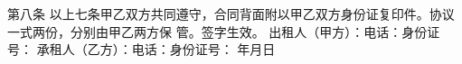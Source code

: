 \documentclass[12pt,a4paper]{article}
\begin{document}
\newline{}
\newline{}
第八条
\newline{}
以上七条甲乙双方共同遵守，合同背面附以甲乙双方身份证复印件。协议一式两份，分别由甲乙两方保
管。签字生效。
\newline{}
\newline{}
出租人（甲方）：\hspace*{2cm}电话：\hspace*{3cm}身份证号：
\newline{}
\newline{}
承租人（乙方）：\hspace*{2cm}电话：\hspace*{3cm}身份证号：
\newline{}
\hspace*{8cm}年\hspace*{1cm}月\hspace*{1cm}日






\clearpage
\end{document}
